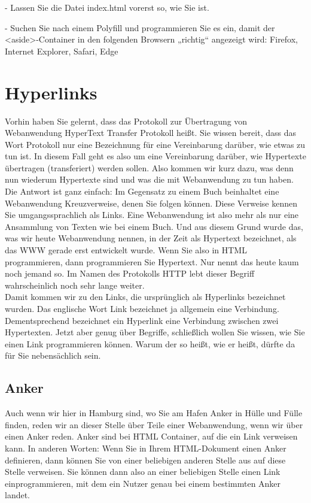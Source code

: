 -	Lassen Sie die Datei index.html vorerst so, wie Sie ist.          

-	Suchen Sie nach einem Polyfill und programmieren Sie es ein, damit der <aside>-Container in den folgenden Browsern „richtig“ angezeigt wird: Firefox, Internet Explorer, Safari, Edge

\section{Hyperlinks}

Vorhin haben Sie gelernt, dass das Protokoll zur Übertragung von Webanwendung HyperText Transfer Protokoll heißt. Sie wissen bereit, dass das Wort Protokoll nur eine Bezeichnung für eine Vereinbarung darüber, wie etwas zu tun ist. In diesem Fall geht es also um eine Vereinbarung darüber, wie Hypertexte übertragen (transferiert) werden sollen. Also kommen wir kurz dazu, was denn nun wiederum Hypertexte sind und was die mit Webanwendung zu tun haben.\\

Die Antwort ist ganz einfach: Im Gegensatz zu einem Buch beinhaltet eine Webanwendung Kreuzverweise, denen Sie folgen können. Diese Verweise kennen Sie umgangssprachlich als Links. Eine Webanwendung ist also mehr als nur eine Ansammlung von Texten wie bei einem Buch. Und aus diesem Grund wurde das, was wir heute Webanwendung nennen, in der Zeit als Hypertext bezeichnet, als das WWW gerade erst entwickelt wurde. Wenn Sie also in HTML programmieren, dann programmieren Sie Hypertext. Nur nennt das heute kaum noch jemand so. Im Namen des Protokolls HTTP lebt dieser Begriff wahrscheinlich noch sehr lange weiter.\\

Damit kommen wir zu den Links, die ursprünglich als Hyperlinks bezeichnet wurden. Das englische Wort Link bezeichnet ja allgemein eine Verbindung. Dementsprechend bezeichnet ein Hyperlink eine Verbindung zwischen zwei Hypertexten. Jetzt aber genug über Begriffe, schließlich wollen Sie wissen, wie Sie einen Link programmieren können. Warum der so heißt, wie er heißt, dürfte da für Sie nebensächlich sein.

\subsection{Anker}

Auch wenn wir hier in Hamburg sind, wo Sie am Hafen Anker in Hülle und Fülle finden, reden wir an dieser Stelle über Teile einer Webanwendung, wenn wir über einen Anker reden. Anker sind bei HTML Container, auf die ein Link verweisen kann. In anderen Worten: Wenn Sie in Ihrem HTML-Dokument einen Anker definieren, dann können Sie von einer beliebigen anderen Stelle aus auf diese Stelle verweisen. Sie können dann also an einer beliebigen Stelle einen Link einprogrammieren, mit dem ein Nutzer genau bei einem bestimmten Anker landet.\\

